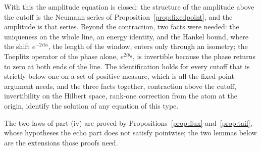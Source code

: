 \documentclass[11pt]{article}
\theoremstyle{definition}
\theoremstyle{remark}
\begin{document}
With this the amplitude equation is closed: the structure of the amplitude above the cutoff is the Neumann series of Proposition~\ref{prop:fixedpoint}, and the amplitude is that series. Beyond the contraction, two facts were needed: the uniqueness on the whole line, an energy identity, and the Hankel bound, where the shift $e^{-2ita}$, the length of the window, enters only through an isometry; the Toeplitz operator of the phase alone, $e^{2i\theta_a}$, is invertible because the phase returns to zero at both ends of the line. The identification holds for every cutoff that is strictly below one on a set of positive measure, which is all the fixed-point argument needs, and the three facts together, contraction above the cutoff, invertibility on the Hilbert space, rank-one correction from the atom at the origin, identify the solution of any equation of this type.




The two laws of part (iv) are proved by Propositions~\ref{prop:flux} and~\ref{prop:tail}, whose hypotheses the echo part does not satisfy pointwise; the two lemmas below are the extensions those proofs need.
\end{document}
